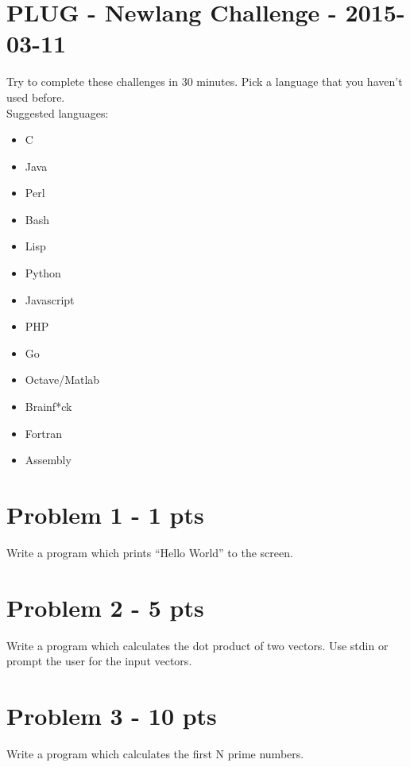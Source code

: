 \documentclass{article}
\begin{document}
\section*{PLUG - Newlang Challenge - 2015-03-11}

Try to complete these challenges in 30 minutes.  Pick a language that you haven't used before.\\

Suggested languages:
\begin{itemize}
\item C
\item Java
\item Perl
\item Bash
\item Lisp
\item Python
\item Javascript
\item PHP
\item Go
\item Octave/Matlab
\item Brainf*ck
\item Fortran
\item Assembly
\end{itemize}

\section{Problem 1 - 1 pts}

Write a program which prints ``Hello World'' to the screen.

\section{Problem 2 - 5 pts}

Write a program which calculates the dot product of two vectors.  Use stdin or prompt the user for the input vectors.

\section{Problem 3 - 10 pts}

Write a program which calculates the first N prime numbers.
\end{document}
